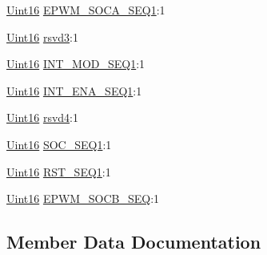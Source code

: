 \begin{DoxyCompactItemize}
\item 
\hyperlink{_d_s_p2833x___device_8h_a59a9f6be4562c327cbfb4f7e8e18f08b}{Uint16} \hyperlink{struct_a_d_c_t_r_l2___b_i_t_s_a6ae1fb756d8fc06e7e7d7477aed0b307}{E\+P\+W\+M\+\_\+\+S\+O\+C\+A\+\_\+\+S\+E\+Q1}\+:1
\item 
\hyperlink{_d_s_p2833x___device_8h_a59a9f6be4562c327cbfb4f7e8e18f08b}{Uint16} \hyperlink{struct_a_d_c_t_r_l2___b_i_t_s_a4e501bc4865b8ca877c1643c91da6e77}{rsvd3}\+:1
\item 
\hyperlink{_d_s_p2833x___device_8h_a59a9f6be4562c327cbfb4f7e8e18f08b}{Uint16} \hyperlink{struct_a_d_c_t_r_l2___b_i_t_s_a103309fd478d94de05a1ef4c6b6aafbd}{I\+N\+T\+\_\+\+M\+O\+D\+\_\+\+S\+E\+Q1}\+:1
\item 
\hyperlink{_d_s_p2833x___device_8h_a59a9f6be4562c327cbfb4f7e8e18f08b}{Uint16} \hyperlink{struct_a_d_c_t_r_l2___b_i_t_s_a043820e8c6fa39eea11171d3ea15c199}{I\+N\+T\+\_\+\+E\+N\+A\+\_\+\+S\+E\+Q1}\+:1
\item 
\hyperlink{_d_s_p2833x___device_8h_a59a9f6be4562c327cbfb4f7e8e18f08b}{Uint16} \hyperlink{struct_a_d_c_t_r_l2___b_i_t_s_aa05e525862c591dd3bf377e93c0e23cf}{rsvd4}\+:1
\item 
\hyperlink{_d_s_p2833x___device_8h_a59a9f6be4562c327cbfb4f7e8e18f08b}{Uint16} \hyperlink{struct_a_d_c_t_r_l2___b_i_t_s_ac68520557f1472730d25c16787953d74}{S\+O\+C\+\_\+\+S\+E\+Q1}\+:1
\item 
\hyperlink{_d_s_p2833x___device_8h_a59a9f6be4562c327cbfb4f7e8e18f08b}{Uint16} \hyperlink{struct_a_d_c_t_r_l2___b_i_t_s_a85111ffd7333b815f729a3cc6c946bef}{R\+S\+T\+\_\+\+S\+E\+Q1}\+:1
\item 
\hyperlink{_d_s_p2833x___device_8h_a59a9f6be4562c327cbfb4f7e8e18f08b}{Uint16} \hyperlink{struct_a_d_c_t_r_l2___b_i_t_s_a8eac0d62e485ea3a2ffac1ee1dd636da}{E\+P\+W\+M\+\_\+\+S\+O\+C\+B\+\_\+\+S\+E\+Q}\+:1
\end{DoxyCompactItemize}


\subsection{Member Data Documentation}
\hypertarget{struct_a_d_c_t_r_l2___b_i_t_s_a6ae1fb756d8fc06e7e7d7477aed0b307}{}
